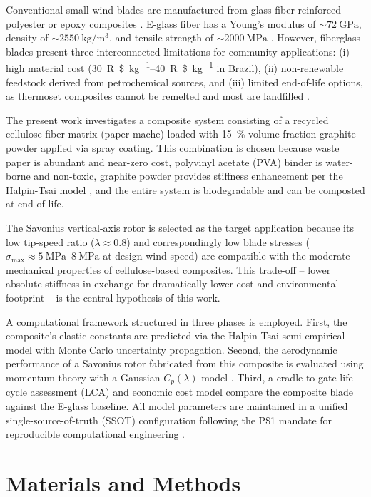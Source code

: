\documentclass[twocolumn]{article}
\newcommand{\BrazilianReal}{R\$}
\begin{document}
Conventional small wind blades are manufactured from glass-fiber-reinforced polyester or epoxy composites \cite{brondsted2005}. E-glass fiber has a Young's modulus of $\sim\SI{72}{\giga\pascal}$, density of $\sim\SI{2550}{\kilogram\per\cubic\meter}$, and tensile strength of $\sim\SI{2000}{\mega\pascal}$ \cite{callister2018}. However, fiberglass blades present three interconnected limitations for community applications: (i) high material cost (\SIrange{30}{40}{\BrazilianReal\per\kilogram} in Brazil), (ii) non-renewable feedstock derived from petrochemical sources, and (iii) limited end-of-life options, as thermoset composites cannot be remelted and most are landfilled \cite{liu2022}.

The present work investigates a composite system consisting of a recycled cellulose fiber matrix (paper mache) loaded with 15~\% volume fraction graphite powder applied via spray coating. This combination is chosen because waste paper is abundant and near-zero cost, polyvinyl acetate (PVA) binder is water-borne and non-toxic, graphite powder provides stiffness enhancement per the Halpin-Tsai model \cite{halpin1976}, and the entire system is biodegradable and can be composted at end of life.

The Savonius vertical-axis rotor is selected as the target application because its low tip-speed ratio ($\lambda \approx 0.8$) and correspondingly low blade stresses ($\sigma_{\max} \approx \SIrange{5}{8}{\mega\pascal}$ at design wind speed) are compatible with the moderate mechanical properties of cellulose-based composites. This trade-off -- lower absolute stiffness in exchange for dramatically lower cost and environmental footprint -- is the central hypothesis of this work.

A computational framework structured in three phases is employed. First, the composite's elastic constants are predicted via the Halpin-Tsai semi-empirical model with Monte Carlo uncertainty propagation. Second, the aerodynamic performance of a Savonius rotor fabricated from this composite is evaluated using momentum theory with a Gaussian $C_p(\lambda)$ model \cite{savonius1931,akwa2012}. Third, a cradle-to-gate life-cycle assessment (LCA) and economic cost model compare the composite blade against the E-glass baseline. All model parameters are maintained in a unified single-source-of-truth (SSOT) configuration following the P\$1 mandate for reproducible computational engineering \cite{bioeolica2026}.

\section{Materials and Methods}
\end{document}
